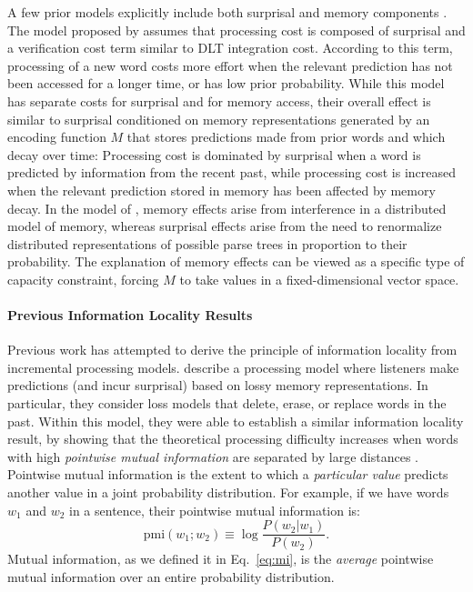 A few prior models explicitly include both surprisal and memory components \citep{demberg2009computational,rasmussen2018left}.
The model proposed by \citet{demberg2009computational} assumes that processing cost is composed of surprisal and a verification cost term similar to DLT integration cost.
According to this term, processing of a new word costs more effort when the relevant prediction has not been accessed for a longer time, or has low prior probability.
While this model has separate costs for surprisal and for memory access, their overall effect is similar to surprisal conditioned on memory representations generated by an encoding function $M$ that stores predictions made from prior words and which decay over time:
Processing cost is dominated by surprisal when a word is predicted by information from the recent past, while processing cost is increased when the relevant prediction stored in memory has been affected by memory decay.
In the model of \citet{rasmussen2018left}, memory effects arise from interference in a distributed model of memory, whereas surprisal effects arise from the need to renormalize distributed representations of possible parse trees in proportion to their probability.
The explanation of memory effects can be viewed as a specific type of capacity constraint, forcing $M$ to take values in a fixed-dimensional vector space.



\paragraph{Previous Information Locality Results}

Previous work has attempted to derive the principle of information locality from incremental processing models. 
\citet{futrell2020lossy} describe a processing model where listeners make predictions (and incur surprisal) based on lossy memory representations.
In particular, they consider loss models that delete, erase, or replace words in the past.
Within this model, they were able to establish a similar information locality result, by showing that the theoretical processing difficulty increases when words with high \emph{pointwise mutual information} are separated by large distances \citep{futrell2019information,futrell2020lossy}. Pointwise mutual information is the extent to which a \emph{particular value} predicts another value in a joint probability distribution. For example, if we have words $w_1$ and $w_2$ in a sentence, their pointwise mutual information is:
\begin{equation*}
    \text{pmi}(w_1; w_2) \equiv \log \frac{P(w_2|w_1)}{P(w_2)}.
\end{equation*}
Mutual information, as we defined it in Eq.~\ref{eq:mi}, is the \emph{average} pointwise mutual information over an entire probability distribution.

